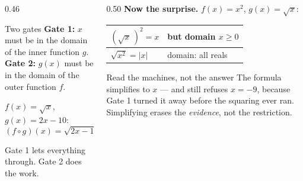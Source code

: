\documentclass[aspectratio=169, 11pt]{beamer}
\begin{document}
\begin{frame}[t, plain]
  \begin{columns}[T]
    \begin{column}{0.46\textwidth}
      \footnotesize
      \begin{block}{Two gates}
        \textbf{Gate 1:} $x$ must be in the domain of the inner function $g$. \\[3pt]
        \textbf{Gate 2:} $g(x)$ must be in the domain of the outer function $f$.
      \end{block}
      \vspace{4pt}
      $f(x)=\sqrt{x}$, $g(x)=2x-10$:
      \[ (f\circ g)(x)=\sqrt{2x-10}, \quad x\ge5 \]
      \vspace{-8pt}
      \begin{center}
      Gate 1 lets everything through. Gate 2 does the work.
      \end{center}
    \end{column}
    \begin{column}{0.50\textwidth}
      \footnotesize
      \textbf{Now the surprise.} $f(x)=x^{2}$, $g(x)=\sqrt{x}$:
      \vspace{3pt}
      \begin{center}
      \renewcommand{\arraystretch}{1.4}
      \begin{tabular}{|l|l|}
      \hline
      $\left(\sqrt{x}\,\right)^{2}=x$ & but domain $x\ge0$ \\ \hline
      $\sqrt{x^{2}}=|x|$ & domain: all reals \\ \hline
      \end{tabular}
      \end{center}
      \vspace{4pt}
      \begin{block}{Read the machines, not the answer}
        The formula simplifies to $x$ --- and still refuses $x=-9$, because Gate 1 turned it away
        before the squaring ever ran. \\[3pt]
        Simplifying erases the \emph{evidence}, not the restriction.
      \end{block}
    \end{column}
  \end{columns}
\end{frame}
\end{document}
